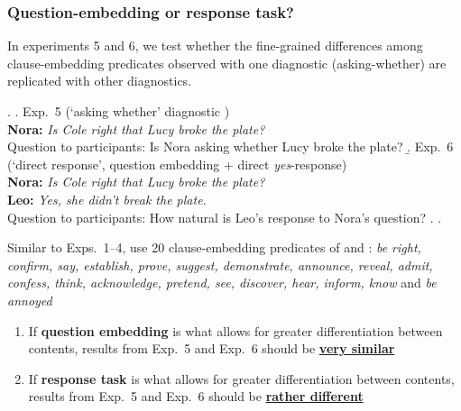 \documentclass[compress, xcolor = dvipsnames, aspectratio=169]{beamer}
\begin{document}
	\begin{frame}[t]\frametitle{Question-embedding or response task?}\scriptsize
	

		In experiments 5 and 6, we test whether the fine-grained differences among clause-embedding predicates observed with one diagnostic (asking-whether) are replicated with other diagnostics.

		\ex.
		    \a.\label{exp5} Exp.~5 (`asking whether' diagnostic )
		    \\ {\bf Nora:} \emph{Is Cole right that Lucy broke the plate?}
		    \\ Question to participants: Is Nora asking whether Lucy broke the plate?\smallskip
		    \b.\label{exp6} Exp.~6 (`direct response', question embedding + direct \emph{yes}-response)
		    \\ {\bf Nora:} \emph{Is Cole right that Lucy broke the plate?}
		    \\ {\bf Leo:} \emph{Yes, she didn't break the plate.}
		    \\ Question to participants: How natural is Leo's response to Nora's question?
		    \z. \z. 
	
		\vfill \pause
		Similar to Exps.~1–4, use 20 clause-embedding predicates of \citet{tonhauser_how_2018} and \citealt{degen-tonhauser-glossa}: \emph{be right, confirm, say, establish, prove, suggest, demonstrate, announce, reveal, admit, confess, think, acknowledge, pretend, see, discover, hear, inform, know} and \emph{be annoyed}\vfill\pause

		\begin{enumerate}
			\item If \textbf{question embedding} is what allows for greater differentiation between contents, results from Exp.~5 and Exp.~6 should be \textbf{\underline{very similar}}\pause

			\item If \textbf{response task} is what allows for greater differentiation between contents, results from Exp.~5 and Exp.~6 should be \textbf{\underline{rather different}}
		\end{enumerate}

	\end{frame}
\end{document}
